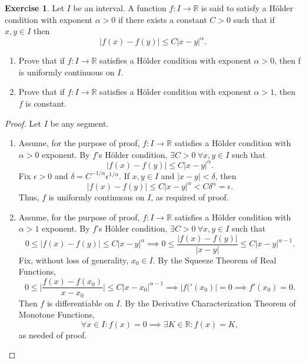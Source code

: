 \documentclass[12pt]{article}
\theoremstyle{definition}
\newtheorem{exercise}{Exercise}
\begin{document}
\thispagestyle{firstpage}

\begin{exercise}
    Let \(I\) be an interval. A function \(f : I \to \mathbb{R}\) is said to satisfy a Hölder condition with exponent \(\alpha > 0\) if there exists a constant \(C > 0\) such that if \(x,y \in I\) then
    \[
        \vert f(x) - f(y) \vert \leq C \vert x - y \vert^{\alpha}.
    \]
    \begin{enumerate}[label=(\alph*)]
        \item Prove that if \(f : I \to \mathbb{R}\) satisfies a Hölder condition with exponent \(\alpha > 0\), then f is uniformly continuous on \(I\).
        \item Prove that if \(f : I \to \mathbb{R}\) satisfies a Hölder condition with exponent \(\alpha > 1\), then \(f\) is constant.
    \end{enumerate}
\end{exercise}

\begin{proof}
    Let \(I\) be any segment. 
    \begin{enumerate}[label=(\alph*)]
        \item Assume, for the purpose of proof, \(f : I \to \mathbb{R}\) satisfies a Hölder condition with \(\alpha > 0\) exponent. By \(f\)'s Hölder condition, \(\exists C > 0 \ \forall x,y \in I\) such that
        \[
            \vert f(x) - f(y) \vert \leq C \vert x - y \vert^{\alpha}.
        \]
        Fix \(\epsilon > 0\) and \(\delta = C^{-1 / \alpha}\epsilon^{1 / \alpha}\). If \(x,y \in I\) and \(\vert x - y \vert < \delta\), then
        \[
            \vert f(x) - f(y) \vert \leq C \vert x - y \vert^{\alpha} < C\delta^{\alpha} = \epsilon.
        \]
        Thus, \(f\) is uniformly continuous on \(I\), as required of proof.
        \item Assume, for the purpose of proof, \(f : I \to \mathbb{R}\) satisfies a Hölder condition with \(\alpha > 1\) exponent. By \(f\)'s Hölder condition,  \(\exists C > 0 \ \forall x,y \in I\) such that
        \[
            0 \leq \vert f(x) - f(y) \vert \leq C \vert x - y \vert^{\alpha} \implies 0 \leq \frac{\vert f(x) - f(y) \vert}{\vert x - y \vert} \leq C \vert x - y \vert^{\alpha - 1}.
        \]
        Fix, without loss of generality, \(x_0 \in I\). By the Squeeze Theorem of Real Functions,
        \[
            0 \leq \bigg\vert \frac{f(x) - f(x_0)}{x - x_0} \bigg\vert \leq C \vert x - x_0 \vert^{\alpha - 1} \implies \vert f('(x_0) \vert = 0 \implies f'(x_0) = 0.
        \]
        Then \(f\) is differentiable on \(I\). By the Derivative Characterization Theorem of Monotone Functions, 
        \[
            \forall x \in I : f(x) = 0 \implies \exists K \in \mathbb{R} : f(x) = K,
        \]
        as needed of proof.
    \end{enumerate}
\end{proof}
\end{document}
